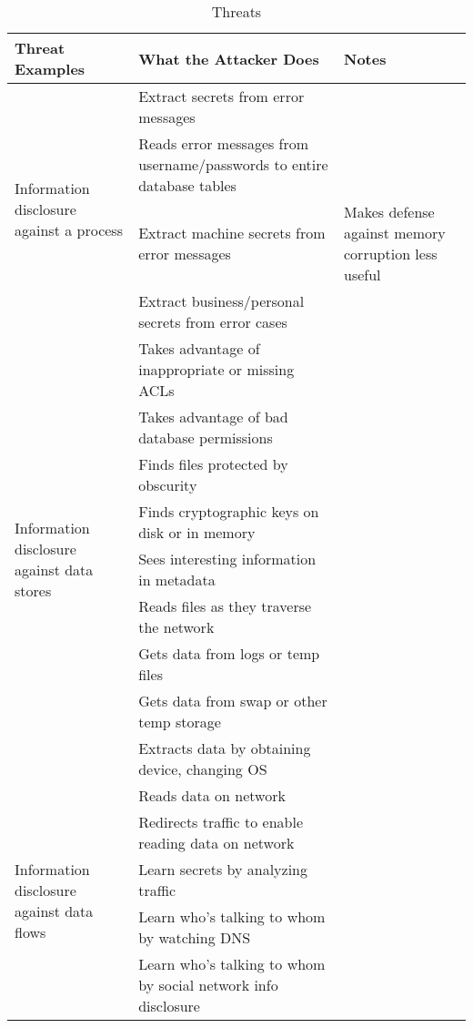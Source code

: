 \begin{table}[h!]
  \centering
  \begin{tabular}{p{5.7cm}p{5.7cm}p{5.7cm}}
    \toprule
    Threat Examples & What the Attacker Does & Notes \\
    \midrule
    \multirow{4}{5.7cm}{Information disclosure against a process} & Extract secrets from error messages & \\ \cline{2-3}
                    & Reads error messages from username/passwords to entire database tables & \\ \cline{2-3}
                    & Extract machine secrets from error messages & Makes defense against memory corruption less useful \\ \cline{2-3}
                    & Extract business/personal secrets from error cases & \\
    \midrule
    \multirow{9}{5.7cm}{Information disclosure against data stores} & Takes advantage of inappropriate or missing ACLs & \\ \cline{2-3}
                    & Takes advantage of bad database permissions & \\ \cline{2-3}
                    & Finds files protected by obscurity & \\ \cline{2-3}
                    & Finds cryptographic keys on disk or in memory & \\ \cline{2-3}
                    & Sees interesting information in metadata & \\ \cline{2-3}
                    & Reads files as they traverse the network & \\ \cline{2-3}
                    & Gets data from logs or temp files & \\ \cline{2-3}
                    & Gets data from swap or other temp storage & \\ \cline{2-3}
                    & Extracts data by obtaining device, changing OS & \\
    \midrule
    \multirow{5}{5.7cm}{Information disclosure against data flows} & Reads data on network & \\ \cline{2-3}
                    & Redirects traffic to enable reading data on network & \\ \cline{2-3}
                    & Learn secrets by analyzing traffic & \\ \cline{2-3}
                    & Learn who's talking to whom by watching DNS & \\ \cline{2-3}
                    & Learn who's talking to whom by social network info disclosure & \\
    \bottomrule
  \end{tabular}
  \caption{ Threats}
  \label{tab:Information_Disclosure_Threats}
\end{table}

